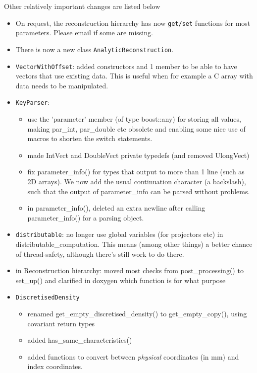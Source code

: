 \documentclass{article}
\begin{document}
Other relatively important changes are listed below
\begin{itemize}
\item On request, the reconstruction hierarchy has now \texttt{get/set} functions for 
most parameters. Please email if some are missing.
\item There is now a new class \texttt{AnalyticReconstruction}.
\item \texttt{VectorWithOffset}: added
  constructors and 1 member to be able to have vectors that use existing
  data. This is useful when for example a C array with data needs to be
  manipulated.

\item \texttt{KeyParser}: 
  \begin{itemize} 
  \item use the 'parameter' member (of type
  boost::any) for storing all values, making par\_int, par\_double etc
  obsolete and enabling some nice use of macros to shorten the switch
  statements.  
  \item made IntVect and DoubleVect private typedefs (and removed
  UlongVect) 
  \item fix parameter\_info() for types that
  output to more than 1 line (such as 2D arrays). We now add the usual
  continuation character (a backslash), such that the output of
  parameter\_info can be parsed without problems.  
  \item in parameter\_info(),
  deleted an extra newline after calling parameter\_info() for a parsing
  object.
  \end{itemize}

\item \texttt{distributable}:
  no longer use global variables (for
  projectors etc) in distributable\_computation. This means (among other
  things) a better chance of thread-safety, although there's still work to
  do there.

\item in Reconstruction hierarchy:  moved most checks
  from post\_processing() to set\_up() and clarified in doxygen which function 
  is for what purpose

\item \texttt{DiscretisedDensity}
 \begin{itemize}
  \item renamed get\_empty\_discretised\_density() to get\_empty\_copy(), using 
  covariant return types 
  \item added has\_same\_characteristics() 
  \item added functions to convert between \textit{physical} coordinates (in mm)
    and index coordinates.
  \end{itemize}


\end{itemize}
\end{document}
